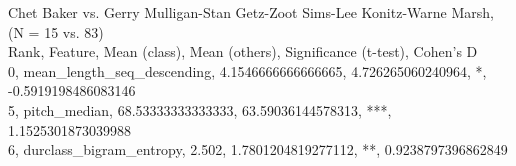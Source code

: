 Chet Baker vs. Gerry Mulligan-Stan Getz-Zoot Sims-Lee Konitz-Warne Marsh, (N = 15 vs. 83)\\
Rank, Feature, Mean (class), Mean (others), Significance (t-test), Cohen's D\\
0, mean_length_seq_descending, 4.1546666666666665, 4.726265060240964, *, -0.5919198486083146\\
5, pitch_median, 68.53333333333333, 63.59036144578313, ***, 1.1525301873039988\\
6, durclass_bigram_entropy, 2.502, 1.7801204819277112, **, 0.9238797396862849\\
